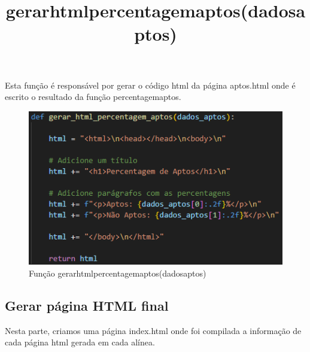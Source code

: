 \documentclass[11pt,a4paper]{report}%
\begin{document}
\newpage
\title{\textbf{gerar\textunderscore html\textunderscore percentagem\textunderscore aptos(dados\textunderscore aptos)}}

Esta função é responsável por gerar o código html da página aptos.html onde é escrito o resultado da função percentagem\textunderscore aptos.


\begin{figure}[htbp]
\centerline{\includegraphics[scale=0.8]{gerar_html_percentagem_aptos.png}}
\caption{Função gerar\textunderscore html\textunderscore percentagem\textunderscore aptos(dados\textunderscore aptos)}
\label{fig}
\end{figure} 



\newpage
\subsection{Gerar página HTML final} \label{subsec:htmlGenerator}
Nesta parte, criamos uma página index.html onde foi compilada a informação de cada página html gerada em cada alínea.
\end{document}

